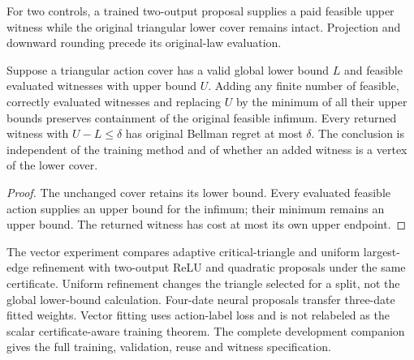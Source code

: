 For two controls, a trained two-output proposal supplies a paid feasible upper witness while the original triangular lower cover remains intact. Projection and downward rounding precede its original-law evaluation.
\begin{proposition}\label{prop:vector-witness69}
Suppose a triangular action cover has a valid global lower bound $L$ and feasible evaluated witnesses with upper bound $U$. Adding any finite number of feasible, correctly evaluated witnesses and replacing $U$ by the minimum of all their upper bounds preserves containment of the original feasible infimum. Every returned witness with $U-L\le\delta$ has original Bellman regret at most $\delta$. The conclusion is independent of the training method and of whether an added witness is a vertex of the lower cover.
\end{proposition}
\begin{proof}
The unchanged cover retains its lower bound. Every evaluated feasible action supplies an upper bound for the infimum; their minimum remains an upper bound. The returned witness has cost at most its own upper endpoint.
\end{proof}

The vector experiment compares adaptive critical-triangle and uniform largest-edge refinement with two-output ReLU and quadratic proposals under the same certificate. Uniform refinement changes the triangle selected for a split, not the global lower-bound calculation. Four-date neural proposals transfer three-date fitted weights. Vector fitting uses action-label loss and is not relabeled as the scalar certificate-aware training theorem. The complete development companion gives the full training, validation, reuse and witness specification.
